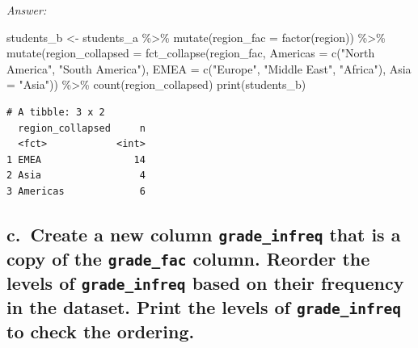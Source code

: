 \documentclass[
]{book}
\newenvironment{Shaded}{\begin{snugshade}}{\end{snugshade}}
\newcommand{\AttributeTok}[1]{\textcolor[rgb]{0.77,0.63,0.00}{#1}}
\newcommand{\FunctionTok}[1]{\textcolor[rgb]{0.00,0.00,0.00}{#1}}
\newcommand{\NormalTok}[1]{#1}
\newcommand{\OtherTok}[1]{\textcolor[rgb]{0.56,0.35,0.01}{#1}}
\newcommand{\SpecialCharTok}[1]{\textcolor[rgb]{0.00,0.00,0.00}{#1}}
\newcommand{\StringTok}[1]{\textcolor[rgb]{0.31,0.60,0.02}{#1}}
\begin{document}
\emph{Answer:}

\begin{Shaded}
\begin{Highlighting}[]
\NormalTok{students\_b }\OtherTok{\textless{}{-}}\NormalTok{ students\_a }\SpecialCharTok{\%\textgreater{}\%}
  \FunctionTok{mutate}\NormalTok{(}\AttributeTok{region\_fac =} \FunctionTok{factor}\NormalTok{(region)) }\SpecialCharTok{\%\textgreater{}\%}
  \FunctionTok{mutate}\NormalTok{(}\AttributeTok{region\_collapsed =} \FunctionTok{fct\_collapse}\NormalTok{(region\_fac, }
                                         \AttributeTok{Americas =} \FunctionTok{c}\NormalTok{(}\StringTok{"North America"}\NormalTok{, }\StringTok{"South America"}\NormalTok{), }
                                         \AttributeTok{EMEA =} \FunctionTok{c}\NormalTok{(}\StringTok{"Europe"}\NormalTok{, }\StringTok{"Middle East"}\NormalTok{, }\StringTok{"Africa"}\NormalTok{), }
                                         \AttributeTok{Asia =} \StringTok{"Asia"}\NormalTok{)) }\SpecialCharTok{\%\textgreater{}\%}
  \FunctionTok{count}\NormalTok{(region\_collapsed)}
\FunctionTok{print}\NormalTok{(students\_b)}
\end{Highlighting}
\end{Shaded}

\begin{verbatim}
# A tibble: 3 x 2
  region_collapsed     n
  <fct>            <int>
1 EMEA                14
2 Asia                 4
3 Americas             6
\end{verbatim}

\hypertarget{c.-create-a-new-column-grade_infreq-that-is-a-copy-of-the-grade_fac-column.-reorder-the-levels-of-grade_infreq-based-on-their-frequency-in-the-dataset.-print-the-levels-of-grade_infreq-to-check-the-ordering.}{%
\subsection{\texorpdfstring{c.~Create a new column \texttt{grade\_infreq} that is a copy of the \texttt{grade\_fac} column. Reorder the levels of \texttt{grade\_infreq} based on their frequency in the dataset. Print the levels of \texttt{grade\_infreq} to check the ordering.}{c.~Create a new column grade\_infreq that is a copy of the grade\_fac column. Reorder the levels of grade\_infreq based on their frequency in the dataset. Print the levels of grade\_infreq to check the ordering.}}\label{c.-create-a-new-column-grade_infreq-that-is-a-copy-of-the-grade_fac-column.-reorder-the-levels-of-grade_infreq-based-on-their-frequency-in-the-dataset.-print-the-levels-of-grade_infreq-to-check-the-ordering.}}
\end{document}

